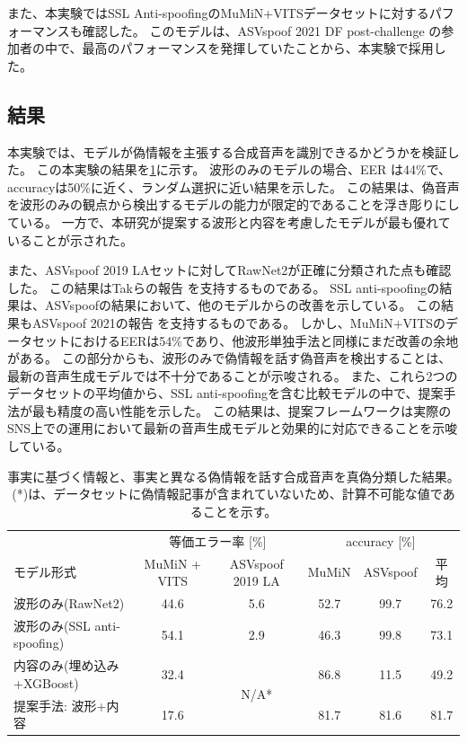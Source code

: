 また、本実験ではSSL Anti-spoofingのMuMiN+VITSデータセットに対するパフォーマンスも確認した。
このモデルは、ASVspoof 2021 DF post-challenge \cite{10155166}の参加者の中で、最高のパフォーマンスを発揮していたことから、本実験で採用した。

\subsection{結果}\label{sec:cnt_res}
本実験では、モデルが偽情報を主張する合成音声を識別できるかどうかを検証した。
この本実験の結果を\ref{tab:result}に示す。
波形のみのモデルの場合、EER は44\%で、accuracyは50\%に近く、ランダム選択に近い結果を示した。
この結果は、偽音声を波形のみの観点から検出するモデルの能力が限定的であることを浮き彫りにしている。
一方で、本研究が提案する波形と内容を考慮したモデルが最も優れていることが示された。

また、ASVspoof 2019 LAセットに対してRawNet2が正確に分類された点も確認した。
この結果はTakらの報告 \cite{9414234}を支持するものである。
SSL anti-spoofingの結果は、ASVspoofの結果において、他のモデルからの改善を示している。
この結果もASVspoof 2021の報告 \cite{10155166}を支持するものである。
しかし、MuMiN+VITSのデータセットにおけるEERは54\%であり、他波形単独手法と同様にまだ改善の余地がある。
この部分からも、波形のみで偽情報を話す偽音声を検出することは、最新の音声生成モデルでは不十分であることが示唆される。
また、これら2つのデータセットの平均値から、SSL anti-spoofingを含む比較モデルの中で、提案手法が最も精度の高い性能を示した。
この結果は、提案フレームワークは実際のSNS上での運用において最新の音声生成モデルと効果的に対応できることを示唆している。

\begin{landscape}
\begin{table}[p]
    \caption{事実に基づく情報と、事実と異なる偽情報を話す合成音声を真偽分類した結果。(*)は、データセットに偽情報記事が含まれていないため、計算不可能な値であることを示す。}
    \centering
    \begin{tabular}{lcc|ccc}\hline
         & \multicolumn{2}{c}{等価エラー率 [\%]} & \multicolumn{3}{c}{accuracy [\%]}\\
       モデル形式 & MuMiN + VITS & ASVspoof 2019 LA & MuMiN & ASVspoof & 平均\\\hline\hline
       波形のみ(RawNet2) & 44.6 & 5.6 & 52.7 & 99.7 & 76.2\\
       波形のみ(SSL anti-spoofing) & 54.1 & 2.9 & 46.3 & 99.8 & 73.1\\\hline
       内容のみ(埋め込み+XGBoost) & 32.4 & \multirow{2}{*}{N/A*} & 86.8 & 11.5 & 49.2\\
       提案手法: 波形+内容 & 17.6 & & 81.7 & 81.6 & 81.7 \\\hline
    \end{tabular}
    \label{tab:result}
\end{table}
\end{landscape}


